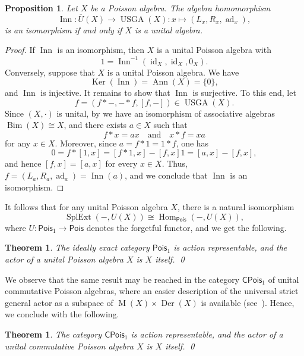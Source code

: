 \documentclass[reqno,a4paper]{amsart}
\theoremstyle{plain}
\newtheorem{theorem}[subsection]{Theorem}
\newtheorem{proposition}[subsection]{Proposition}
\theoremstyle{definition}
\theoremstyle{remark}
\numberwithin{equation}{section}
\newcommand{\noproof}{\hfil\qed}
\DeclareMathOperator{\Ker}{Ker}
\DeclareMathOperator{\Hom}{Hom}
\DeclareMathOperator{\Bim}{Bim}
\DeclareMathOperator{\SplExt}{SplExt}
\DeclareMathOperator{\Der}{Der}
\DeclareMathOperator{\Inn}{Inn}
\DeclareMathOperator{\M}{M}
\DeclareMathOperator{\USGA}{USGA}
\DeclareMathOperator{\Ann}{Ann}
\DeclareMathOperator{\id}{id}
\newcommand{\Pois}{\ensuremath{\mathsf{Pois}}}
\newcommand{\CPois}{\ensuremath{\mathsf{CPois}}}
\begin{document}
\begin{proposition}\label{prop_pois}
Let $X$ be a Poisson algebra. The algebra homomorphism
\[
\Inn \colon \overline{U}(X) \to \USGA(X) \colon x \mapsto (L_x, R_x, \operatorname{ad}_x),
\] 
is an isomorphism if and only if $X$ is a unital algebra.
\end{proposition}

\begin{proof}
If $\Inn$ is an isomorphism, then $X$ is a unital Poisson algebra with
\[
1=\Inn^{-1}(\id_X,\id_X,0_X).
\]
Conversely, suppose that $X$ is a unital Poisson algebra. We have
\[
\Ker(\Inn)=\Ann(X)=\{0\},
\]
and $\Inn$ is injective. It remains to show that $\Inn$ is surjective. To this end, let
\[
f=(f \ast -, - \ast f, [f,-]) \in \USGA(X).
\]
Since $(X,\cdot)$ is unital, by  we have an isomorphism of associative algebras $\Bim(X) \cong X$, and there exists $a \in X$ such that
\[
f \ast x= ax \quad \text{and} \quad x \ast f= xa
\]
for any $x \in X$. Moreover, since $a=f \ast 1=1 \ast f$, one has
\[
0=f \ast [1,x]=[f \ast 1,x]-[f,x]1=[a,x]-[f,x],
\]
and hence $[f,x]=[a,x]$ for every $x \in X$. Thus, $f=(L_a,R_a,\operatorname{ad}_a)=\Inn(a)$, and we conclude that $\Inn$ is an isomorphism.
\end{proof}

It follows that for any unital Poisson algebra $X$, there is a natural isomorphism
\[
\SplExt(-, U(X)) \cong \Hom_\Pois(-,U(X)),
\]
where $U \colon \Pois_{1} \to \Pois$ denotes the forgetful functor, and we get the following.

\begin{theorem}
The ideally exact category $\Pois_{1}$ is action representable, and the actor of a unital Poisson algebra $X$ is $X$ itself. \noproof
\end{theorem}

We observe that the same result may be reached in the category $\CPois_{1}$ of unital commutative Poisson algebras, where an easier description of the universal strict general actor as a subspace of $\M(X) \times \Der(X)$ is available (see~\cite{CigoliManciniMetere}). 
Hence, we conclude with the following.

\begin{theorem}
The category $\CPois_{1}$ is action representable, and the actor of a unital commutative Poisson algebra $X$ is $X$ itself. \noproof
\end{theorem}
\end{document}
